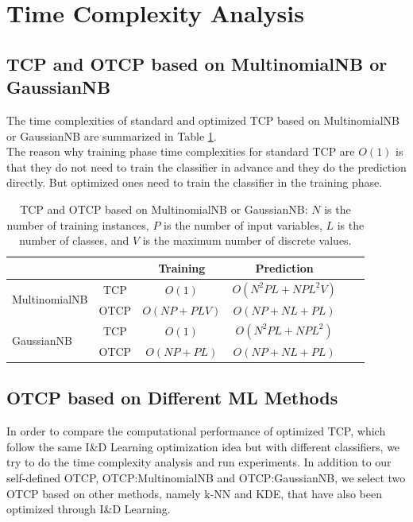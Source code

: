 \documentclass[10pt]{reportMaster}
\begin{document}
\section{Time Complexity Analysis}

\subsection{TCP and OTCP based on MultinomialNB or GaussianNB}

The time complexities of standard and optimized TCP based on MultinomialNB or GaussianNB are summarized in Table \ref{tab:TCA_1}. \\

\noindent The reason why training phase time complexities for standard TCP are $O(1)$ is that they do not need to train the classifier in advance and they do the prediction directly. But optimized ones need to train the classifier in the training phase. \\

\begin{table}[H]
\centering
\begin{tabular}{ l c c c c c }
\hline
 &  & Training & Prediction \\ \hline
\multirow{2}{*}{MultinomialNB} & TCP & $O(1)$ &  $O(N^2PL+NPL^2V)$ \\ 
 & OTCP & $O(NP+PLV)$ & $O(NP+NL+PL)$ \\ \hline
\multirow{2}{*}{GaussianNB} & TCP & $O(1)$ & $O(N^2PL+NPL^2)$\\ 
 & OTCP & $O(NP+PL)$ & $O(NP+NL+PL)$ \\ \hline
\end{tabular}
\caption{\label{tab:TCA_1}TCP and OTCP based on MultinomialNB or GaussianNB: $N$ is the number of training instances, $P$ is the number of input variables, $L$ is the number of classes, and $V$ is the maximum number of discrete values.}
\end{table}

\subsection{OTCP based on Different ML Methods}

In order to compare the computational performance of optimized TCP, which follow the same I\&D Learning optimization idea but with different classifiers, we try to do the time complexity analysis and run experiments. In addition to our self-defined OTCP, OTCP:MultinomialNB and OTCP:GaussianNB, we select two OTCP based on other methods, namely k-NN and KDE, that have also been optimized through I\&D Learning.\\
\end{document}
